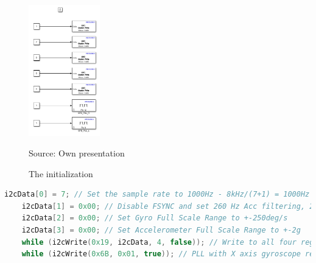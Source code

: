 	\begin{figure}[H]
		\centering
		\includegraphics[width=0.275\textwidth]{figures/init.PNG}
		\caption{The initialization}	
		Source: Own presentation	
		\label{fig:init}	
	\end{figure}
	\begin{mdframed}
		\begin{lstlisting}[caption={C-Code from the script}, language=c,label={lst:init}]
	i2cData[0] = 7; // Set the sample rate to 1000Hz - 8kHz/(7+1) = 1000Hz
	i2cData[1] = 0x00; // Disable FSYNC and set 260 Hz Acc filtering, 256 Hz Gyro filtering, 8 KHz sampling
	i2cData[2] = 0x00; // Set Gyro Full Scale Range to +-250deg/s
	i2cData[3] = 0x00; // Set Accelerometer Full Scale Range to +-2g
	while (i2cWrite(0x19, i2cData, 4, false)); // Write to all four registers at once
	while (i2cWrite(0x6B, 0x01, true)); // PLL with X axis gyroscope reference and disable sleep mode		
		\end{lstlisting}
	\end{mdframed}	
